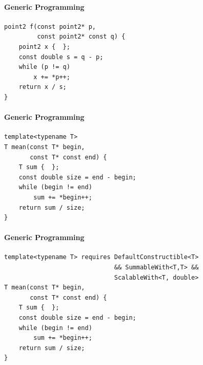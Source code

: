 \documentclass{beamer}
\begin{document}
    \begin{frame}[fragile]{}
        \framesubtitle{Generic Programming}
        \begin{center}
        \begin{lstlisting}[caption={another mysterious, yet strangely familiar function (déjà vu?).}]
point2 f(const point2* p,
         const point2* const q) {
    point2 x {  };
    const double s = q - p;
    while (p != q)
        x += *p++;
    return x / s;
} \end{lstlisting}
        \end{center}
    \end{frame}

    \begin{frame}[fragile]{}
        \framesubtitle{Generic Programming}
        \begin{center}
            \begin{lstlisting}[caption={natural generalization of the function from the previous slides.}]
template<typename T>
T mean(const T* begin,
       const T* const end) {
    T sum {  };
    const double size = end - begin;
    while (begin != end)
        sum += *begin++;
    return sum / size;
} \end{lstlisting}
        \end{center}
    \end{frame}

    \begin{frame}[fragile]{}
        \framesubtitle{Generic Programming}
        \begin{center}
        \begin{lstlisting}
template<typename T> requires DefaultConstructible<T>
                              && SummableWith<T,T> &&
                              ScalableWith<T, double>
T mean(const T* begin,
       const T* const end) {
    T sum {  };
    const double size = end - begin;
    while (begin != end)
        sum += *begin++;
    return sum / size;
} \end{lstlisting}
        \end{center}
    \end{frame}
\end{document}
